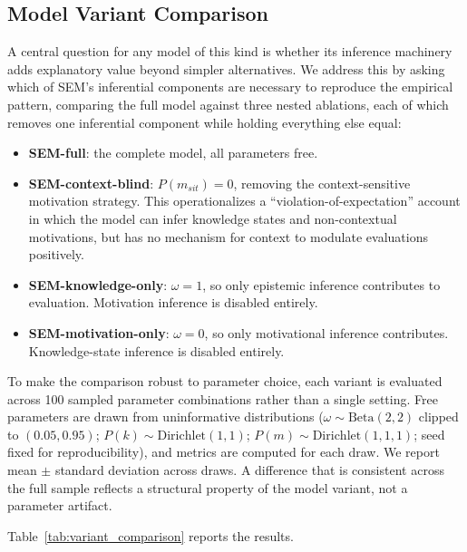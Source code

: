 \documentclass[12pt,a4paper]{article}
\begin{document}
\subsection{Model Variant Comparison}
\label{sec:variants}

A central question for any model of this kind is whether its inference machinery
adds explanatory value beyond simpler alternatives. We address this by asking
which of SEM's inferential components are necessary to reproduce the empirical
pattern, comparing the full model against three nested ablations, each of which
removes one inferential component while holding everything else equal:

\begin{itemize}
\item \textbf{SEM-full}: the complete model, all parameters free.
\item \textbf{SEM-context-blind}: $P(m_{sit}) = 0$, removing the
context-sensitive motivation strategy. This operationalizes a
``violation-of-expectation'' account in which the model can infer knowledge
states and non-contextual motivations, but has no mechanism for context to
modulate evaluations positively.
\item \textbf{SEM-knowledge-only}: $\omega = 1$, so only epistemic inference
contributes to evaluation. Motivation inference is disabled entirely.
\item \textbf{SEM-motivation-only}: $\omega = 0$, so only motivational inference
contributes. Knowledge-state inference is disabled entirely.
\end{itemize}

To make the comparison robust to parameter choice, each variant is evaluated
across 100 sampled parameter combinations rather than a single setting. Free
parameters are drawn from uninformative distributions ($\omega \sim
\text{Beta}(2,2)$ clipped to $(0.05, 0.95)$; $P(k) \sim \text{Dirichlet}(1,1)$;
$P(m) \sim \text{Dirichlet}(1,1,1)$; seed fixed for reproducibility), and
metrics are computed for each draw. We report mean $\pm$ standard deviation
across draws. A difference that is consistent across the full sample reflects
a structural property of the model variant, not a parameter artifact.

Table~\ref{tab:variant_comparison} reports the results.
\end{document}
